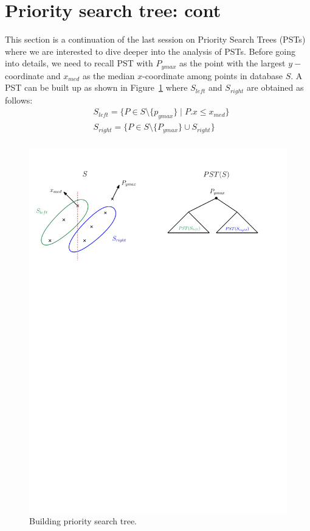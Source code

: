 \section{Priority search tree: cont}
\label{sec:range-queries}

This section is a continuation of the last session on Priority Search Trees (PSTs) where we are interested to dive deeper into the analysis of PSTs. Before going into details, we need to recall PST with $P_{ymax}$ as the point with the largest $y-$coordinate and $x_{med}$ as the median $x$-coordinate among points in database $S$. A PST can be built up as shown in Figure~\ref{fig:PST1} where $S_{left}$ and $S_{right}$ are obtained as follows:
\begin{align*}
    & S_{left}=\{P \in S\setminus \{p_{ymax}\} \mid P.x \leq x_{med} \}\\
    &  S_{right}=\{P \in S\setminus \{P_{ymax}\} \cup S_{right}\}\\
\end{align*}
\begin{figure}[h!]
\begin{center}
  \includegraphics[scale = .5]{ipe/RQ1.pdf}
  \vspace{-0.1in}
  \caption{Building priority search tree.}
  \label{fig:PST1}
\end{center}
\end{figure}

